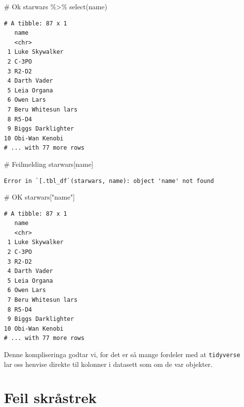 \documentclass[
  letterpaper,
  DIV=11,
  numbers=noendperiod]{scrreprt}
\newenvironment{Shaded}{\begin{snugshade}}{\end{snugshade}}
\newcommand{\CommentTok}[1]{\textcolor[rgb]{0.37,0.37,0.37}{#1}}
\newcommand{\FunctionTok}[1]{\textcolor[rgb]{0.28,0.35,0.67}{#1}}
\newcommand{\NormalTok}[1]{\textcolor[rgb]{0.00,0.23,0.31}{#1}}
\newcommand{\SpecialCharTok}[1]{\textcolor[rgb]{0.37,0.37,0.37}{#1}}
\newcommand{\StringTok}[1]{\textcolor[rgb]{0.13,0.47,0.30}{#1}}
\begin{document}
\begin{Shaded}
\begin{Highlighting}[]
\CommentTok{\# Ok}
\NormalTok{starwars }\SpecialCharTok{\%\textgreater{}\%} 
  \FunctionTok{select}\NormalTok{(name)}
\end{Highlighting}
\end{Shaded}

\begin{verbatim}
# A tibble: 87 x 1
   name              
   <chr>             
 1 Luke Skywalker    
 2 C-3PO             
 3 R2-D2             
 4 Darth Vader       
 5 Leia Organa       
 6 Owen Lars         
 7 Beru Whitesun lars
 8 R5-D4             
 9 Biggs Darklighter 
10 Obi-Wan Kenobi    
# ... with 77 more rows
\end{verbatim}

\begin{Shaded}
\begin{Highlighting}[]
\CommentTok{\# Feilmelding}
\NormalTok{starwars[name]}
\end{Highlighting}
\end{Shaded}

\begin{verbatim}
Error in `[.tbl_df`(starwars, name): object 'name' not found
\end{verbatim}

\begin{Shaded}
\begin{Highlighting}[]
\CommentTok{\# OK}
\NormalTok{starwars[}\StringTok{"name"}\NormalTok{]}
\end{Highlighting}
\end{Shaded}

\begin{verbatim}
# A tibble: 87 x 1
   name              
   <chr>             
 1 Luke Skywalker    
 2 C-3PO             
 3 R2-D2             
 4 Darth Vader       
 5 Leia Organa       
 6 Owen Lars         
 7 Beru Whitesun lars
 8 R5-D4             
 9 Biggs Darklighter 
10 Obi-Wan Kenobi    
# ... with 77 more rows
\end{verbatim}

Denne kompliseringa godtar vi, for det er så mange fordeler med at
\texttt{tidyverse} lar oss henvise direkte til kolonner i datasett som
om de var objekter.

\hypertarget{feil-skruxe5strek}{%
\section{Feil skråstrek}\label{feil-skruxe5strek}}
\end{document}
